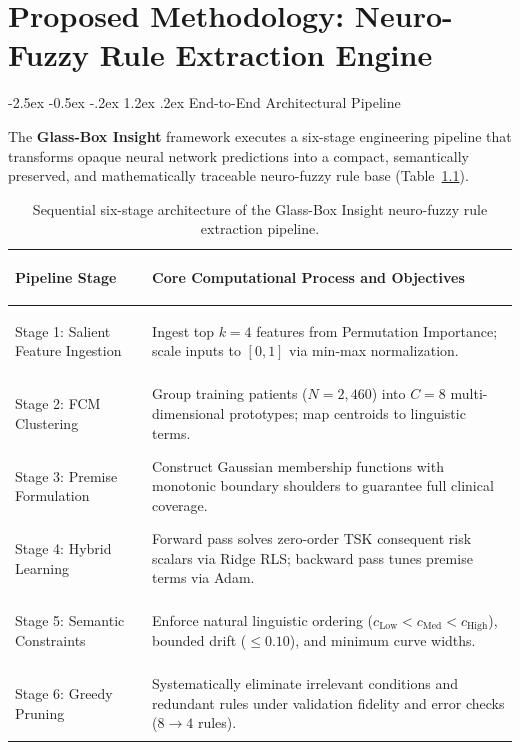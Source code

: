 \documentclass[12pt,a4paper,oneside]{report}
\makeatletter
\renewcommand\section{\@startsection {section}{1}{\z@}%
                                   {-2.5ex \@plus -0.5ex \@minus -.2ex}%
                                   {1.2ex \@plus .2ex}%
                                   {\normalfont\fontsize{13}{16}\selectfont\bfseries}}
\makeatother
\begin{document}
\chapter{Proposed Methodology: Neuro-Fuzzy Rule Extraction Engine}

\section{End-to-End Architectural Pipeline}

The \textbf{Glass-Box Insight} framework executes a six-stage engineering pipeline that transforms opaque neural network predictions into a compact, semantically preserved, and mathematically traceable neuro-fuzzy rule base (Table~\ref{tab:methodology_pipeline}).

\begin{table}[htbp]
    \centering
    \footnotesize
    \renewcommand{\arraystretch}{0.80}
    \begin{tabularx}{\textwidth}{>{\bfseries\raggedright\arraybackslash}p{3.5cm} >{\raggedright\arraybackslash}X}
    \toprule
    \textbf{Pipeline Stage} & \textbf{Core Computational Process and Objectives} \\
    \midrule
    Stage 1: Salient Feature Ingestion & Ingest top $k=4$ features from Permutation Importance; scale inputs to $[0, 1]$ via min-max normalization. \\
    \midrule
    Stage 2: FCM Clustering & Group training patients ($N=2{,}460$) into $C=8$ multi-dimensional prototypes; map centroids to linguistic terms. \\
    \midrule
    Stage 3: Premise Formulation & Construct Gaussian membership functions with monotonic boundary shoulders to guarantee full clinical coverage. \\
    \midrule
    Stage 4: Hybrid Learning & Forward pass solves zero-order TSK consequent risk scalars via Ridge RLS; backward pass tunes premise terms via Adam. \\
    \midrule
    Stage 5: Semantic Constraints & Enforce natural linguistic ordering ($c_{\text{Low}} < c_{\text{Med}} < c_{\text{High}}$), bounded drift ($\le 0.10$), and minimum curve widths. \\
    \midrule
    Stage 6: Greedy Pruning & Systematically eliminate irrelevant conditions and redundant rules under validation fidelity and error checks ($8 \to 4$ rules). \\
    \bottomrule
    \end{tabularx}
    \caption[Six-Stage Glass-Box Extraction Architecture]{Sequential six-stage architecture of the Glass-Box Insight neuro-fuzzy rule extraction pipeline.}
    \label{tab:methodology_pipeline}
\end{table}
\end{document}
